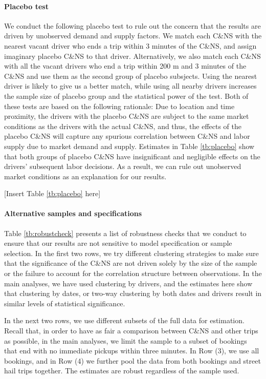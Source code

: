 \documentclass[reviewmode,AEJ]{AEA}
\begin{document}
\paragraph{Placebo test}
We conduct the following placebo test to rule out the concern that the results are driven by unobserved demand and supply factors. We match each C\&NS with the nearest vacant driver who ends a trip within 3 minutes of the C\&NS, and assign imaginary placebo C\&NS to that driver. Alternatively, we also match each C\&NS with all the vacant drivers who end a trip within 200 m and 3 minutes of the C\&NS and use them as the second group of placebo subsjects. Using the nearest driver is likely to give us a better match, while using all nearby drivers increases the sample size of placebo group and the statistical power of the test. Both of these tests are based on the following rationale: Due to location and time proximity, the drivers with the placebo C\&NS are subject to the same market conditions as the drivers with the actual C\&NS, and thus, the effects of the placebo C\&NS will capture any spurious correlation between C\&NS and labor supply due to market demand and supply. Estimates in Table \ref{tb:placebo} show that both groups of placebo C\&NS have insignificant and negligible effects on the drivers' subsequent labor decisions. As a result, we can rule out unobserved market conditions as an explanation for our results.

\begin{center}
    [Insert Table \ref{tb:placebo} here]
\end{center}


\paragraph{Alternative samples and specifications} Table \ref{tb:robustcheck} presents a list of robustness checks that we conduct to ensure that our results are not sensitive to model specification or sample selection. In the first two rows, we try different clustering strategies  to make sure that the significance of the C\&NS are not driven solely by the size of the sample or the failure to account for the correlation structure between observations. In the main analyses, we have used clustering by drivers, and the estimates here show that clustering by dates, or two-way clustering by both dates and drivers result in similar levels of statistical significance. 

In the next two rows, we use different subsets of the full data for estimation. Recall that, in order to have as fair a comparison between C\&NS and other trips as possible, in the main analyses, we limit the sample to a subset of bookings that end with no immediate pickups within three minutes. In Row (3), we use all bookings, and in Row (4) we further pool the data from both bookings and street hail trips together. The estimates are robust regardless of the sample used.
\end{document}
